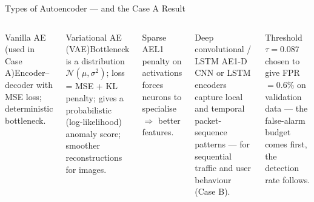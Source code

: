 \documentclass[aspectratio=169,10pt,t]{beamer}
\begin{document}
\begin{frame}{Types of Autoencoder --- and the Case A Result}
\begin{columns}[T]
\begin{cbox}[ISSAnavy]{Vanilla AE (used in Case A)}\scriptsize Encoder--decoder with MSE loss; deterministic bottleneck.\end{cbox}
\begin{cbox}[ISSAblue]{Variational AE (VAE)}\scriptsize Bottleneck is a distribution $\mathcal{N}(\mu,\sigma^2)$; loss = MSE + KL penalty; gives a probabilistic (log-likelihood) anomaly score; smoother reconstructions for images.\end{cbox}
\begin{cbox}[ISSAgrn]{Sparse AE}\scriptsize L1 penalty on activations forces neurons to specialise $\Rightarrow$ better features.\end{cbox}
\begin{cbox}[violet]{Deep convolutional / LSTM AE}\scriptsize 1-D CNN or LSTM encoders capture local and temporal packet-sequence patterns --- for sequential traffic and user behaviour (Case B).\end{cbox}
\begin{ibox}\scriptsize Threshold $\tau=0.087$ chosen to give FPR $=0.6\%$ on validation data --- the false-alarm budget comes first, the detection rate follows.\end{ibox}
\end{columns}
\end{frame}
\end{document}

